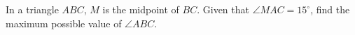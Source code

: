 In a triangle $ABC$, $M$ is the midpoint of $BC$. Given that $\angle MAC=15^{\circ}$, find the maximum possible value of $\angle ABC$.